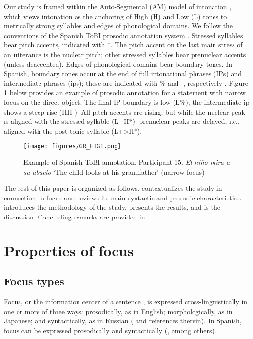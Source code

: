\documentclass[output=paper,colorlinks,citecolor=brown,draftmode]{langscibook}
\begin{document}
\largerpage
Our study is framed within the Auto-Segmental (AM) model of intonation \citep{pierrehumbert1980,PierrehumbertBeckman1988,Ladd2008}, which views intonation as the anchoring of High (H) and Low (L) tones to metrically strong syllables and edges of phonological domains. We follow the conventions of the Spanish ToBI prosodic annotation system \citep{BeckmanMorgan2002,Estebas-VilaplanaPrieto,PrietoRoseano2010,hualde2015}. Stressed syllables bear pitch accents, indicated with *. The pitch accent on the last main stress of an utterance is the nuclear pitch; other stressed syllables bear prenuclear accents (unless deaccented). Edges of phonological domains bear boundary tones. In Spanish, boundary tones occur at the end of full intonational phrases (IPs) and intermediate phrases (ips); these are indicated with \% and -, respectively \citep{AguilarPrieto2009}. Figure 1 below provides an example of prosodic annotation for a statement with narrow focus on the direct object. The final IP boundary is low (L\%); the intermediate ip shows a steep rise (HH-). All pitch accents are rising; but while the nuclear peak is aligned with the stressed syllable (L+H*), prenuclear peaks are delayed, i.e., aligned with the post-tonic syllable (L+>H*).


\begin{figure}
    \texttt{[image: figures/GR\_FIG1.png]}
    \caption{Example of Spanish ToBI annotation. Participant 15. \textit{El niño mira a su abuelo}  ‘The child looks at his grandfather’ (narrow focus)}
    \label{13:Fig1}
\end{figure}

The rest of this paper is organized as follows.  contextualizes the study in connection to focus and reviews its main syntactic and prosodic characteristics.  introduces the methodology of the study.  presents the results, and  is the discussion. Concluding remarks are provided in .
\section{Properties of focus}\label{sec:13:2}
\subsection{Focus types}
Focus, or the information center of a sentence \citep{chomsky1971,Chomsky1976}, is expressed cross-linguistically in one or more of three ways:  prosodically, as in English; morphologically, as in Japanese; and syntactically, as in Russian (\citealp{Gutiérrez-Bravo2008} and references therein). In Spanish, focus can be expressed prosodically and syntactically (\citealp{Zubizarreta1998,Face2006,Chung2012}, among others).
\end{document}
